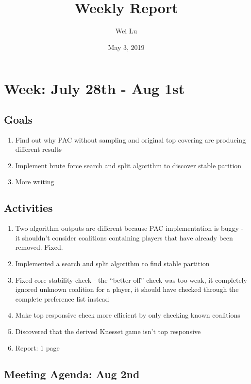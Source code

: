 \documentclass[a4paper]{article}
\title{Weekly Report}
\date{May 3, 2019}
\author{Wei Lu}
\begin{document}
\maketitle

\section*{Week: July 28th - Aug 1st}

\subsection*{Goals}

\begin{enumerate}
  \item Find out why PAC without sampling and original top covering are producing different results
  \item Implement brute force search and split algorithm to discover stable parition
  \item More writing
\end{enumerate}

\subsection*{Activities}

\begin{enumerate}
  \item Two algorithm outputs are different because PAC implementation is buggy - it shouldn't consider coalitions containing players that have already been removed. Fixed.
  \item Implemented a search and split algorithm to find stable partition
  \item Fixed core stability check - the ``better-off'' check was too weak, it completely ignored unknown coalition for a player, it should have checked through the complete preference list instead
  \item Make top responsive check more efficient by only checking known coalitions
  \item Discovered that the derived Knesset game isn't top responsive
  \item Report: 1 page
\end{enumerate}

\subsection*{Meeting Agenda: Aug 2nd}
\end{document}
